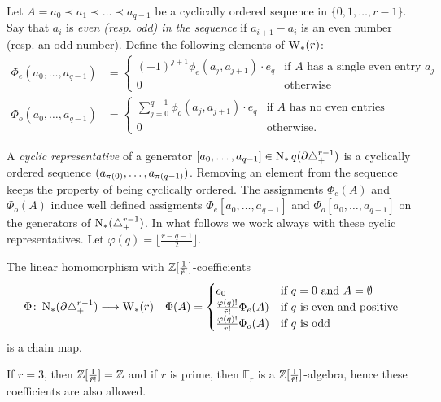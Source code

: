 Let $A= a_0\prec a_1\prec\ldots\prec a_{q-1}$ be a cyclically ordered sequence in $\{0,1,\ldots,r-1\}$. Say that $a_i$ is \emph{even (resp. \emph{odd}) in the sequence} if $a_{i+1}-a_i$ is an even number (resp. an odd number).
Define the following elements of $\operatorname{W}_{*}(r)$:
\begin{align*}
	\Phi_e(a_0,\ldots,a_{q-1}) &= \begin{cases}
		(-1)^{j+1}\phi_e(a_j,a_{j+1})\cdot e_q & \text{if $A$ has a single even entry $a_j$} \\
		0 & \text{otherwise}
	\end{cases}
	\\
	\Phi_o(a_0,\ldots,a_{q-1}) &= \begin{cases}
		\sum_{j=0}^{q-1} \phi_o(a_j,a_{j+1})\cdot e_q & \text{if $A$ has no even entries} \\
		0 & \text{otherwise.}
	\end{cases}
\end{align*}

A \emph{cyclic representative} of a generator $[a_0,\ldots,a_{q-1}]\in \operatorname{N}_{*}{q}(\partial \triangle_{+}^{r-1})$ is a cyclically ordered sequence $(a_{\pi(0)},\ldots,a_{\pi(q-1)})$. Removing an element from the sequence keeps the property of being cyclically ordered. The assignments $\Phi_e(A)$ and $\Phi_o(A)$ induce well defined assigments $\Phi_e[a_0,\ldots,a_{q-1}]$ and $\Phi_o[a_0,\ldots,a_{q-1}]$ on the generators of $\operatorname{N}_{*}(\triangle_{+}^{r-1})$. In what follows we work always with these cyclic representatives. Let $\varphi(q) = \lfloor\frac{r-q-1}{2}\rfloor$.
\begin{theorem} The linear homomorphism with $\mathbb{Z}[\frac{1}{\tilde{r}!}]$-coefficients
	\begin{align*}
		\Phi \colon  \operatorname{N}_{*}(\partial \triangle_{+}^{r-1})&\longrightarrow \operatorname{W}_{*}(r)
		&
		\Phi(A) = \begin{cases}
			e_0 & \text{if $q=0$ and $A = \emptyset$}\\
			\frac{\varphi(q)!}{\tilde{r}!}\Phi_e(A) & \text{if $q$ is even and positive} \\
			\frac{\varphi(q)!}{\tilde{r}!}\Phi_o(A) & \text{if $q$ is odd}
		\end{cases}
	\end{align*}
	is a chain map.
\end{theorem}

\begin{remark}
	If $r=3$, then $\mathbb{Z}[\frac{1}{\tilde{r}!}] = \mathbb{Z}$ and if $r$ is prime, then $\mathbb{F}_r$ is a $\mathbb{Z}[\frac{1}{\tilde{r}!}]$-algebra, hence these coefficients are also allowed.
\end{remark}

